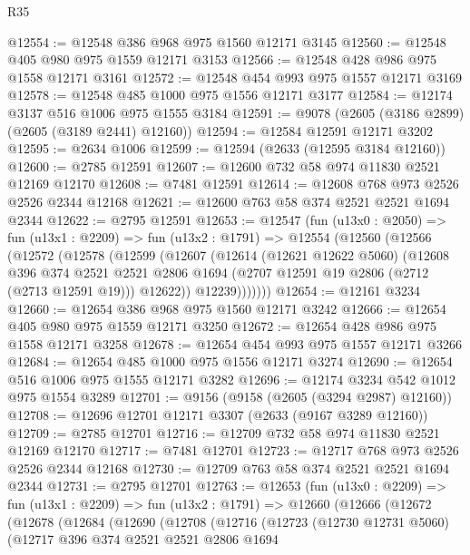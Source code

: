 \begin{lexlean}{R35}
\begin{coremodule}
@12554 := @12548 @386 @968 @975 @1560 @12171 @3145
@12560 := @12548 @405 @980 @975 @1559 @12171 @3153
@12566 := @12548 @428 @986 @975 @1558 @12171 @3161
@12572 := @12548 @454 @993 @975 @1557 @12171 @3169
@12578 := @12548 @485 @1000 @975 @1556 @12171 @3177
@12584 := @12174 @3137 @516 @1006 @975 @1555 @3184
@12591 := @9078 (@2605 (@3186 @2899) (@2605 (@3189 @2441) @12160))
@12594 := @12584 @12591 @12171 @3202
@12595 := @2634 @1006
@12599 := @12594 (@2633 (@12595 @3184 @12160))
@12600 := @2785 @12591
@12607 := @12600 @732 @58 @974 @11830 @2521 @12169 @12170
@12608 := @7481 @12591
@12614 := @12608 @768 @973 @2526 @2526 @2344 @12168
@12621 := @12600 @763 @58 @374 @2521 @2521 @1694 @2344
@12622 := @2795 @12591
@12653 := @12547
    (fun (u13x0 : @2050) =>
    fun (u13x1 : @2209) =>
    fun (u13x2 : @1791) =>
    @12554
      (@12560
        (@12566
          (@12572
            (@12578
              (@12599
                (@12607
                  (@12614
                    (@12621 @12622 @5060)
                    (@12608
                      @396
                      @374
                      @2521
                      @2521
                      @2806
                      @1694
                      (@2707 @12591 @19 @2806 (@2712 (@2713 @12591 @19)))
                      @12622))
                  @12239)))))))
@12654 := @12161 @3234
@12660 := @12654 @386 @968 @975 @1560 @12171 @3242
@12666 := @12654 @405 @980 @975 @1559 @12171 @3250
@12672 := @12654 @428 @986 @975 @1558 @12171 @3258
@12678 := @12654 @454 @993 @975 @1557 @12171 @3266
@12684 := @12654 @485 @1000 @975 @1556 @12171 @3274
@12690 := @12654 @516 @1006 @975 @1555 @12171 @3282
@12696 := @12174 @3234 @542 @1012 @975 @1554 @3289
@12701 := @9156 (@9158 (@2605 (@3294 @2987) @12160))
@12708 := @12696 @12701 @12171 @3307 (@2633 (@9167 @3289 @12160))
@12709 := @2785 @12701
@12716 := @12709 @732 @58 @974 @11830 @2521 @12169 @12170
@12717 := @7481 @12701
@12723 := @12717 @768 @973 @2526 @2526 @2344 @12168
@12730 := @12709 @763 @58 @374 @2521 @2521 @1694 @2344
@12731 := @2795 @12701
@12763 := @12653
    (fun (u13x0 : @2209) =>
    fun (u13x1 : @2209) =>
    fun (u13x2 : @1791) =>
    @12660
      (@12666
        (@12672
          (@12678
            (@12684
              (@12690
                (@12708
                  (@12716
                    (@12723
                      (@12730 @12731 @5060)
                      (@12717
                        @396
                        @374
                        @2521
                        @2521
                        @2806
                        @1694

\end{coremodule}
\end{lexlean}

